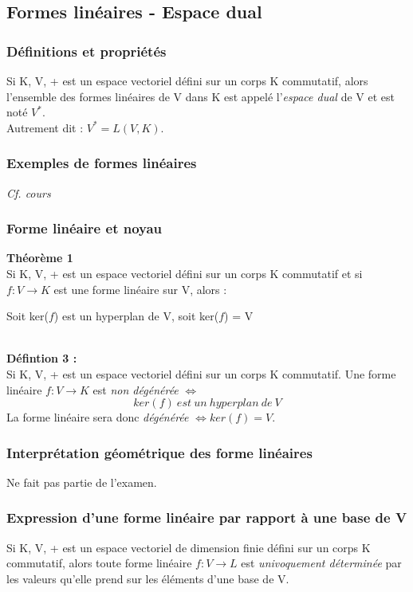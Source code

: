 \documentclass[12pt, a4paper]{article}
\begin{document}
\subsection{Formes linéaires - Espace dual}
\subsubsection{Définitions et propriétés}
Si K, V, + est un espace vectoriel défini sur un corps K commutatif, alors l'ensemble des formes linéaires de V dans K est appelé l'\textit{espace dual} de V et est noté $V^{*}$.\\
Autrement dit : $V^* = L(V, K)$.

\subsubsection{Exemples de formes linéaires}
\textit{Cf. cours}

\subsubsection{Forme linéaire et noyau}
\textbf{Théorème 1}\\
Si K, V, + est un espace vectoriel défini sur un corps K commutatif et si $f : V \rightarrow K$ est une forme linéaire sur V, alors :
\begin{center}
Soit ker($f$) est un hyperplan de V, soit ker($f$) = V
\end{center}
\ \\
\textbf{Défintion 3 :}\\
Si K, V, + est un espace vectoriel défini sur un corps K commutatif. Une forme linéaire $f : V \rightarrow K$ est \textit{non dégénérée} $\Leftrightarrow$
$$ker(f)\ est\ un\ hyperplan\ de\ V$$
La forme linéaire sera donc \textit{dégénérée} $\Leftrightarrow ker(f) = V$.
\subsubsection{Interprétation géométrique des forme linéaires}
Ne fait pas partie de l'examen.

\subsubsection{Expression d'une forme linéaire par rapport à une base de V}
Si K, V, + est un espace vectoriel de dimension finie défini sur un corps K commutatif, alors toute forme linéaire $f : V \rightarrow L$ est \textit{univoquement déterminée} par les valeurs qu'elle prend sur les éléments d'une base de V.
\end{document}
